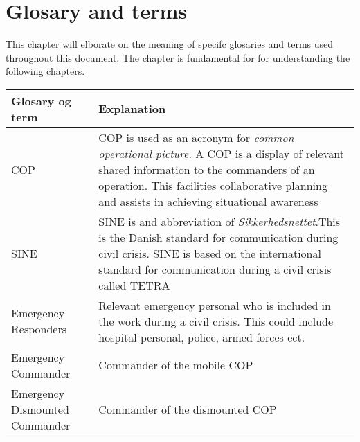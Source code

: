 \label{chp_revisionHistory}
\chapter{Glosary and terms}

This chapter will elborate on the meaning of specifc glosaries and terms used throughout this document. The chapter is fundamental for for understanding the following chapters.

\begin{longtable}{| p{3.5cm} |  p{10cm} | }
	\hline
	\textbf{Glosary og term} &  \textbf{Explanation } \\
	\hline
	COP & COP is used as an acronym for \emph{common operational picture}. A COP is a display of relevant shared information to the commanders of an operation. This facilities collaborative planning and assists in achieving situational awareness \\
	\hline
	SINE & SINE is and abbreviation of \emph{Sikkerhedsnettet}.This is the Danish standard for communication during civil crisis. SINE is based on the international standard for communication during a civil crisis called TETRA\\
	\hline
	Emergency Responders & Relevant emergency personal who is included in the work during a civil crisis. This could include hospital personal, police, armed forces ect.  \\
	\hline
	Emergency Commander & Commander of the mobile COP \\
	\hline
	Emergency Dismounted Commander & Commander of the dismounted COP \\
	\hline
\end{longtable}